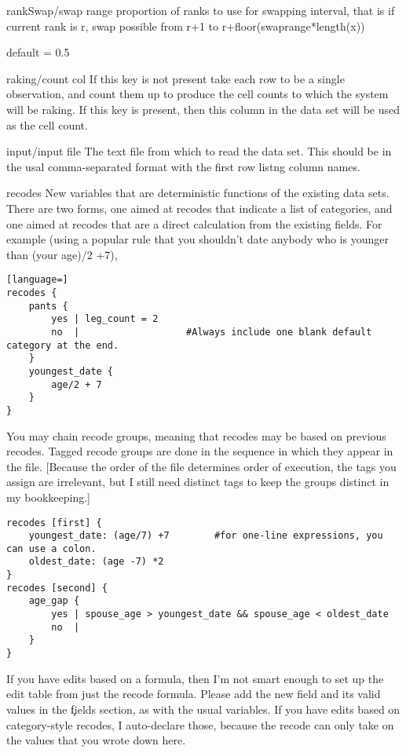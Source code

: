 \begin{key}{rankSwap/swap range}
 proportion of ranks to use for swapping interval, that is
if current rank is r, swap possible from r+1 to r+floor(swaprange*length(x))

default = 0.5

\end{key}

\begin{key}{    raking/count col}
     If this key is not present take each row to be a
		single observation, and count them up to produce the cell counts to which the
		system will be raking. If this key is present, then this column in the data set
		will be used as the cell count.
\end{key}

\begin{key}{input/input file}
 The text file from which to read the data set. This should be in
the usal comma-separated format with the first row listng column names.
\end{key}

\begin{key}{recodes}
 New variables that are deterministic functions of the existing data sets.
There are two forms, one aimed at recodes that indicate a list of categories, and one
aimed at recodes that are a direct calculation from the existing fields.
For example (using a popular rule that you shouldn't date anybody who is younger than
(your age)/2 +7),
\begin{lstlisting}[language=]
recodes { 
    pants {
        yes | leg_count = 2
        no  |                   #Always include one blank default category at the end.
    }
    youngest_date {
        age/2 + 7
    }
}
\end{lstlisting}
You may chain recode groups, meaning that recodes may be based on previous recodes. Tagged
recode groups are done in the sequence in which they appear in the file. [Because the
order of the file determines order of execution, the tags you assign are irrelevant, but
I still need distinct tags to keep the groups distinct in my bookkeeping.]
\begin{lstlisting}
recodes [first] {
    youngest_date: (age/7) +7        #for one-line expressions, you can use a colon.
    oldest_date: (age -7) *2
}
recodes [second] {
    age_gap {
        yes | spouse_age > youngest_date && spouse_age < oldest_date
        no  | 
    }
}
\end{lstlisting}
If you have edits based on a formula, then I'm not smart enough to set up the edit table
from just the recode formula. Please add the new field and its valid values in the \c
fields section, as with the usual variables.
If you have edits based on category-style recodes, I auto-declare those, because the
recode can only take on the values that you wrote down here.
\end{key}

